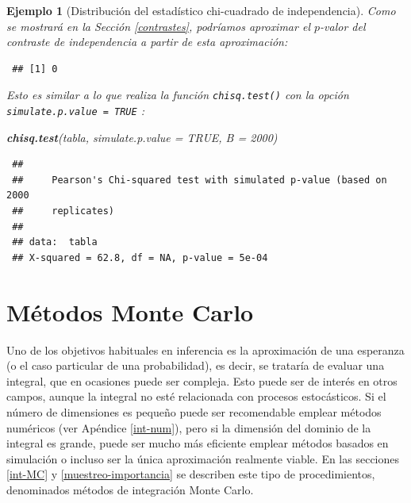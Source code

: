 \documentclass[
  spanish,
  10pt,
]{book}
\newenvironment{Shaded}{\begin{snugshade}}{\end{snugshade}}
\newcommand{\AttributeTok}[1]{\textcolor[rgb]{0.13,0.29,0.53}{#1}}
\newcommand{\ConstantTok}[1]{\textcolor[rgb]{0.56,0.35,0.01}{#1}}
\newcommand{\DecValTok}[1]{\textcolor[rgb]{0.00,0.00,0.81}{#1}}
\newcommand{\FunctionTok}[1]{\textcolor[rgb]{0.13,0.29,0.53}{\textbf{#1}}}
\newcommand{\NormalTok}[1]{#1}
\newcommand{\OtherTok}[1]{\textcolor[rgb]{0.56,0.35,0.01}{#1}}
\newcommand{\SpecialCharTok}[1]{\textcolor[rgb]{0.81,0.36,0.00}{\textbf{#1}}}
\theoremstyle{break}
\newtheorem{example}{Ejemplo}[chapter]
\theoremstyle{nonumberplain}
\begin{document}
\begin{example}[Distribución del estadístico chi-cuadrado de independencia]
Como se mostrará en la Sección \ref{contrastes}, podríamos aproximar el \(p\)-valor del contraste de independencia a partir de esta aproximación:

\begin{Shaded}
\end{Shaded}

\begin{verbatim}
 ## [1] 0
\end{verbatim}

Esto es similar a lo que realiza la función \texttt{chisq.test()} con la opción \texttt{simulate.p.value\ =\ TRUE} \citep[empleando el algoritmo de][]{patefield1981}:

\begin{Shaded}
\begin{Highlighting}[]
\FunctionTok{chisq.test}\NormalTok{(tabla, }\AttributeTok{simulate.p.value =} \ConstantTok{TRUE}\NormalTok{, }\AttributeTok{B =} \DecValTok{2000}\NormalTok{)}
\end{Highlighting}
\end{Shaded}

\begin{verbatim}
 ## 
 ##     Pearson's Chi-squared test with simulated p-value (based on 2000
 ##     replicates)
 ## 
 ## data:  tabla
 ## X-squared = 62.8, df = NA, p-value = 5e-04
\end{verbatim}

\end{example}

\chapter{Métodos Monte Carlo}\label{monte-carlo}

Uno de los objetivos habituales en inferencia es la aproximación de una esperanza (o el caso particular de una probabilidad), es decir, se trataría de evaluar una integral, que en ocasiones puede ser compleja.
Esto puede ser de interés en otros campos, aunque la integral no esté relacionada con procesos estocásticos.
Si el número de dimensiones es pequeño puede ser recomendable emplear métodos numéricos (ver Apéndice \ref{int-num}), pero si la dimensión del dominio de la integral es grande, puede ser mucho más eficiente emplear métodos basados en simulación o incluso ser la única aproximación realmente viable.
En las secciones \ref{int-MC} y \ref{muestreo-importancia} se describen este tipo de procedimientos, denominados métodos de integración Monte Carlo.
\end{document}
